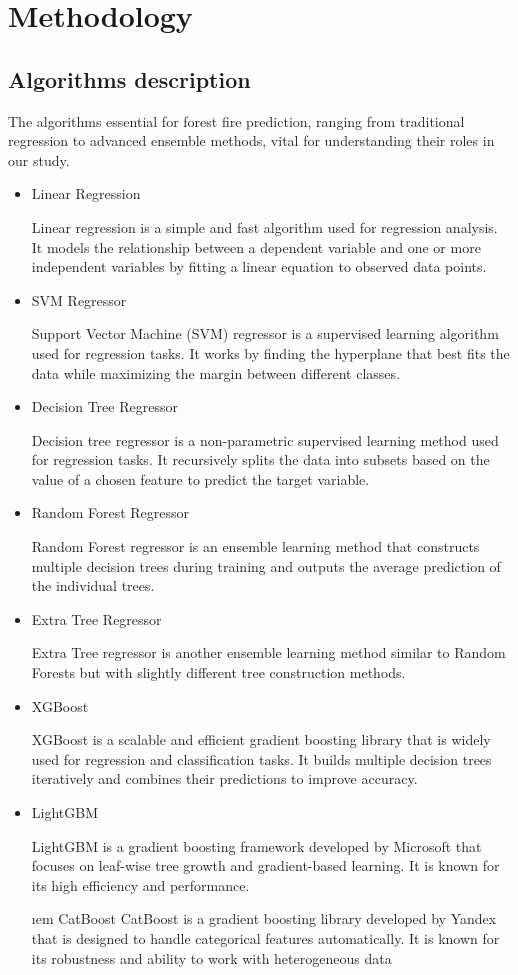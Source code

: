 \chapter{Methodology}
\label{ch:method}

\section{Algorithms description}
The algorithms essential for forest fire prediction, ranging from traditional regression to advanced ensemble methods, vital for understanding their roles in our study.
\begin{itemize}

\item Linear Regression

Linear regression is a simple and fast algorithm used for regression analysis. It models the relationship between a dependent variable and one or more independent variables by fitting a linear
equation to observed data points.

\item SVM Regressor

Support Vector Machine (SVM) regressor is a supervised learning algorithm used for regression tasks. It works by finding the hyperplane that best fits the data while maximizing the margin
between different classes.

\item Decision Tree Regressor

Decision tree regressor is a non-parametric supervised learning method used for regression tasks. It recursively splits the data into subsets based on the value of a chosen feature to predict the target variable.

\item Random Forest Regressor

Random Forest regressor is an ensemble learning method that constructs multiple decision trees during training and outputs the average prediction of the individual trees.

\item Extra Tree Regressor

Extra Tree regressor is another ensemble learning method similar to Random Forests but with slightly different tree construction methods.

\item XGBoost

XGBoost is a scalable and efficient gradient boosting library that is widely used for regression and classification tasks. It builds multiple decision trees iteratively and combines their predictions to improve accuracy.

\item LightGBM

LightGBM is a gradient boosting framework developed by Microsoft that focuses on leaf-wise tree growth and gradient-based learning. It is known for its high efficiency and performance.

\i em CatBoost
CatBoost is a gradient boosting library developed by Yandex that is designed to handle categorical features automatically. It is known for its robustness and ability to work with heterogeneous data
\end{itemize}


